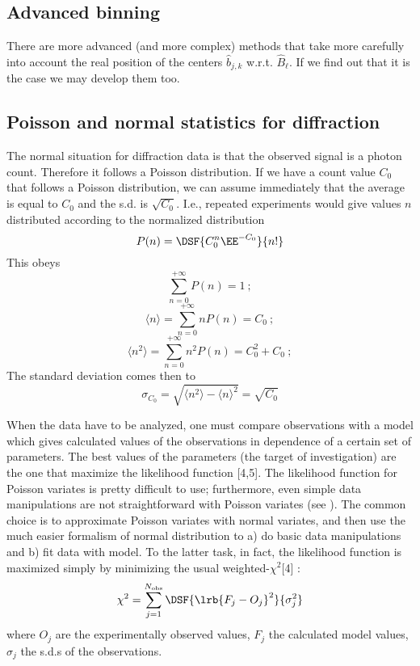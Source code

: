 \subsection{Advanced binning}\label{sec:2}

There are more advanced (and more complex) methods that take more carefully into account the real position of the centers $\hat{b}_{j,k}$ w.r.t. $\hat{B}_\ell$. 
If we find out that it is the case we may develop them too. 


\subsection{Poisson and normal statistics for diffraction}

The normal situation for diffraction data 
is that the observed signal is a photon count. 
Therefore it follows a Poisson distribution. 
If we have a count value $C_0$ that follows a Poisson distribution, 
we can assume immediately that the average is equal to $C_0$ and the s.d. is $\sqrt{C_0}$. 
I.e., repeated experiments would give values $n$ 
distributed according to the normalized distribution
\[
P(n)=\DSF{C_0^n\EE^{-C_0}
}{
n!}
\]
This obeys
\[
\mathop{\sum}_{n=0}^{+\infty}
P(n)=1\ ;
\]
\[
\langle n\rangle=\mathop{\sum}_{n=0}^{+\infty}
nP(n)=C_0\ ;
\]
\[
\langle n^2\rangle=\mathop{\sum}_{n=0}^{+\infty}
n^2 P(n)=C_0^2+C_0\ ;
\]
The standard deviation comes then to
\[
\sigma_{C_0}=\sqrt{\langle n^2\rangle-\langle n\rangle^2}=\sqrt{C_0}
\]

When the data have to be analyzed, one must compare observations with a model 
which gives calculated values of the observations in dependence of a certain set of 
parameters. The best values of the parameters (the target of investigation) 
are the one that maximize the likelihood function [4,5]. The likelihood function for 
Poisson variates is pretty difficult to use; furthermore, even simple data manipulations 
are not straightforward with Poisson variates (see ). The common choice is to approximate 
Poisson variates with normal variates, and then use the much easier formalism 
of normal distribution to a) do basic data manipulations and b) fit data with model. 
To the latter task, in fact, the likelihood function is maximized simply by minimizing 
the usual weighted-$\chi^2$[4] :
\[
\chi^2 = \mathop{\sum}_{j=1}^{N_{\mathrm{obs}}}
\DSF{\lrb{F_j-O_j}^2
}{
\sigma_j^2
}
\]
where $O_j$ are the experimentally observed values, $F_j$ the calculated model values, 
$\sigma_j$ the s.d.s of the observations.

